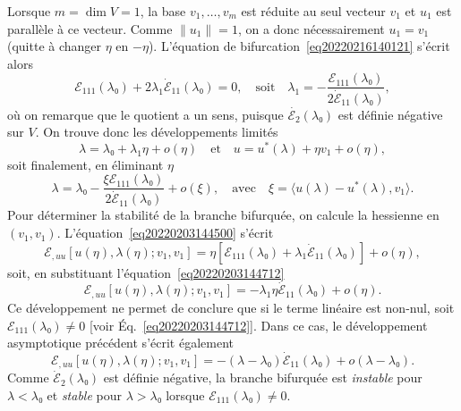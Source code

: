 \documentclass{article}
\newcommand{\tmem}[1]{{\em #1\/}}
\begin{document}
Lorsque $m = \dim V = 1$, la base $v_1, \ldots, v_m$ est réduite au seul
vecteur $v_1$ et $u_1$ est parallèle à ce vecteur. Comme $\lVert u_1
\rVert = 1$, on a donc nécessairement $u_1 = v_1$ (quitte à changer
$η$ en $- η$). L'équation de bifurcation~\eqref{eq20220216140121}
s'écrit alors
\begin{equation}
  \label{eq20220203144712} ℰ_{1  1  1} (λ₀) +
  2 λ_1  \dot{ℰ}_{1  1} (λ₀) = 0, \quad
  \text{soit} \quad λ_1 = - \frac{ℰ_{1  1  1}
  (λ₀)}{2 \dot{ℰ}_{1  1} (λ₀)},
\end{equation}
où on remarque que le quotient a un sens, puisque $\dot{ℰ_2}
(λ₀)$ est définie négative sur $V$. On trouve donc les
développements limités
\begin{equation}
  λ = λ₀ + λ_1 η + o (η)  \quad \text{et} \quad u =
  u^{\ast} (λ) + η v_1 + o (η),
\end{equation}
soit finalement, en éliminant $η$
\begin{equation}
  λ = λ₀ - \frac{ξ ℰ_{1  1  1}
  (λ₀)}{2 \dot{ℰ}_{1  1} (λ₀)} + o (ξ),
  \quad \text{avec} \quad ξ = \langle u (λ) - u^{\ast} (λ), v_1
  \rangle .
\end{equation}
Pour déterminer la stabilité de la branche bifurquée, on calcule
la hessienne en $(v_1, v_1)$. L'équation~\eqref{eq20220203144500}
s'écrit
\begin{equation}
  ℰ_{, u  u} [u (η), λ (η) ; v_1, v_1] = η
  [ℰ_{1  1  1} (λ₀) + λ_1
  \dot{ℰ}_{1  1} (λ₀)] + o (η),
\end{equation}
soit, en substituant l'équation~\eqref{eq20220203144712}
\begin{equation}
  ℰ_{, u  u} [u (η), λ (η) ; v_1, v_1] = -
  λ_1 η \dot{ℰ}_{1  1} (λ₀) + o (η) .
\end{equation}
Ce développement ne permet de conclure que si le terme linéaire est
non-nul, soit $ℰ_{1  1  1} (λ₀) \neq 0$ [voir
Éq.~\eqref{eq20220203144712}]. Dans ce cas, le développement
asymptotique précédent s'écrit également
\begin{equation}
  ℰ_{, u  u} [u (η), λ (η) ; v_1, v_1] = -
  (λ - λ₀)  \dot{ℰ}_{1  1} (λ₀) + o
  (λ - λ₀) .
\end{equation}
Comme $\dot{ℰ}_2 (λ₀)$ est définie négative, la
branche bifurquée est {\tmem{instable}} pour $λ < λ₀$ et
{\tmem{stable}} pour $λ > λ₀$ lorsque $ℰ_{1  1
 1} (λ₀) \neq 0$.
\end{document}
